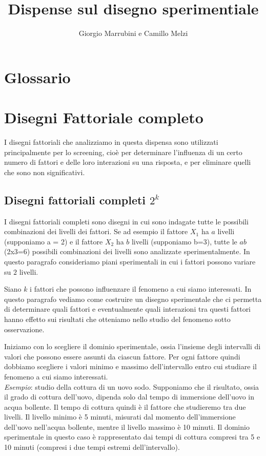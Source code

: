 \documentclass[
]{book}
\title{Dispense sul disegno sperimentiale}
\author{Giorgio Marrubini e Camillo Melzi}
\date{}
\begin{document}
\maketitle

{
\setcounter{tocdepth}{1}
\tableofcontents
}
\hypertarget{glossario}{%
\chapter*{Glossario}\label{glossario}}

\hypertarget{disegni-fattoriale-completo}{%
\chapter{Disegni Fattoriale completo}\label{disegni-fattoriale-completo}}

I disegni fattoriali che analizziamo in questa dispensa sono utilizzati principalmente per lo screening, cioè per determinare l'influenza di un certo numero di fattori e delle loro interazioni su una risposta, e per eliminare quelli che sono non significativi.

\hypertarget{disegni-fattoriali-completi-2k}{%
\section{\texorpdfstring{Disegni fattoriali completi \(2^k\)}{Disegni fattoriali completi 2\^{}k}}\label{disegni-fattoriali-completi-2k}}

\label{sect:Full2}
I disegni fattoriali completi sono disegni in cui sono indagate tutte le possibili combinazioni dei livelli dei fattori. Se ad esempio il fattore \(X_1\) ha \(a\) livelli (supponiamo a = 2) e il fattore \(X_2\) ha \(b\) livelli (supponiamo b=3), tutte le \(ab\) (2x3=6) possibili combinazioni dei livelli sono analizzate sperimentalmente. In questo paragrafo consideriamo piani sperimentali in cui i fattori possono variare su \(2\) livelli.

Siano \(k\) i fattori che possono influenzare il fenomeno a cui siamo interessati. In questo paragrafo vediamo come costruire un disegno sperimentale che ci permetta di determinare quali fattori e eventualmente quali interazioni tra questi fattori hanno effetto sui risultati che otteniamo nello studio del fenomeno sotto osservazione.

Iniziamo con lo scegliere il dominio sperimentale, ossia l'insieme degli intervalli di valori che possono essere assunti da ciascun fattore. Per ogni fattore quindi dobbiamo scegliere i valori minimo e massimo dell'intervallo entro cui studiare il fenomeno a cui siamo interessati.\\
\emph{Esempio}: studio della cottura di un uovo sodo. Supponiamo che il risultato, ossia il grado di cottura dell'uovo, dipenda solo dal tempo di immersione dell'uovo in acqua bollente. Il tempo di cottura quindi è il fattore che studieremo tra due livelli. Il livello minimo è 5 minuti, misurati dal momento dell'immersione dell'uovo nell'acqua bollente, mentre il livello massimo è 10 minuti. Il dominio sperimentale in questo caso è rappresentato dai tempi di cottura compresi tra 5 e 10 minuti (compresi i due tempi estremi dell'intervallo).
\end{document}
